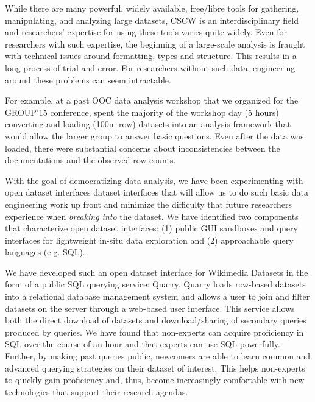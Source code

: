 While there are many powerful, widely available, free/libre tools for gathering, manipulating, and analyzing large datasets, CSCW is an interdisciplinary field and  researchers' expertise for using these tools varies quite widely.  Even for researchers with such expertise, the beginning of a large-scale analysis is fraught with technical issues around formatting, types and structure.  This results in a long process of trial and error. For researchers without such data, engineering around these problems can seem intractable.

For example, at a past OOC data analysis workshop that we organized for the GROUP'15 conference, spent the majority of the workshop day (5 hours) converting and loading (100m row) datasets into an analysis framework that would allow the larger group to answer basic questions.  Even after the data was loaded, there were substantial concerns about inconsistencies between the documentations and the observed row counts.

With the goal of democratizing data analysis, we have been experimenting with open dataset interfaces dataset interfaces that will allow us to do such basic data engineering work up front and minimize the difficulty that future researchers experience when \emph{breaking into} the dataset.  We have identified two components that characterize open dataset interfaces: (1) public GUI sandboxes and query interfaces for lightweight in-situ data exploration and (2) approachable query languages (e.g. SQL).

We have developed such an open dataset interface for Wikimedia Datasets in the form of a public SQL querying service: Quarry.  Quarry loads row-based datasets into a relational database management system and allows a user to join and filter datasets on the server through a web-based user interface.  This service allows both the direct download of datasets and download/sharing of secondary queries produced by queries.  We have found that non-experts can acquire proficiency in SQL over the course of an hour and that experts can use SQL powerfully.  Further, by making past queries public, newcomers are able to learn common and advanced querying strategies on their dataset of interest. This helps non-experts to quickly gain proficiency and, thus, become increasingly comfortable with new technologies that support their research agendas.

